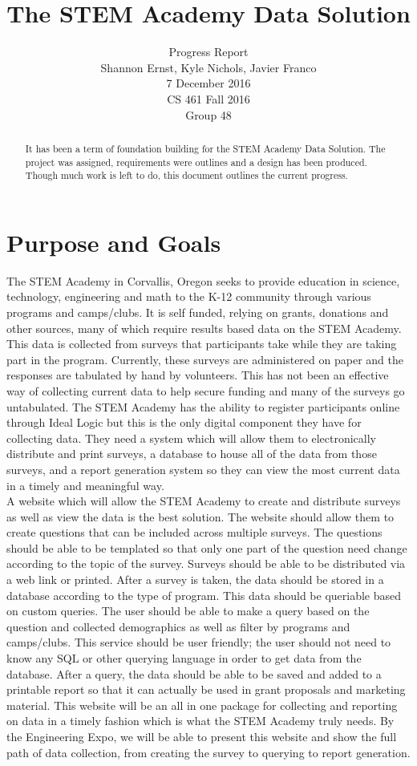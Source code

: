 \documentclass[letterpaper,10pt,serif, draftclsnofoot,onecolumn, compsoc, titlepage]{IEEEtran}
\title{The STEM Academy Data Solution}
\author{Progress Report \\ Shannon Ernst, Kyle Nichols, Javier Franco\\ 7 December 2016\\ CS 461 Fall 2016\\ Group 48}
\begin{document}
\maketitle
\begin{abstract}
It has been a term of foundation building for the STEM Academy Data Solution. The project was assigned, requirements were outlines and a design has been produced. Though much work is left to do, this document outlines the current progress.
\end{abstract}
\newpage
\section{Purpose and Goals}
The STEM Academy in Corvallis, Oregon seeks to provide education in science, technology, engineering and math to the K-12 community through various programs and camps/clubs. It is self funded, relying on grants, donations and other sources, many of which require results based data on the STEM Academy. This data is collected from surveys that participants take while they are taking part in the program. Currently, these surveys are administered on paper and the responses are tabulated by hand by volunteers. This has not been an effective way of collecting current data to help secure funding and many of the surveys go untabulated. The STEM Academy has the ability to register participants online through Ideal Logic but this is the only digital component they have for collecting data. They need a system which will allow them to electronically distribute and print surveys, a database to house all of the data from those surveys, and a report generation system so they can view the most current data in a timely and meaningful way.\\
A website which will allow the STEM Academy to create and distribute surveys as well as view the data is the best solution. The website should allow them to create questions that can be included across multiple surveys. The questions should be able to be templated so that only one part of the question need change according to the topic of the survey. Surveys should be able to be distributed via a web link or printed. After a survey is taken, the data should be stored in a database according to the type of program. This data should be queriable based on custom queries. The user should be able to make a query based on the question and collected demographics as well as filter by programs and camps/clubs. This service should be user friendly; the user should not need to know any SQL or other querying language in order to get data from the database. After a query, the data should be able to be saved and added to a printable report so that it can actually be used in grant proposals and marketing material. This website will be an all in one package for collecting and reporting on data in a timely fashion which is what the STEM Academy truly needs. By the Engineering Expo, we will be able to present this website and show the full path of data collection, from creating the survey to querying to report generation.
\end{document}
